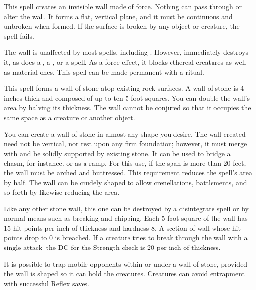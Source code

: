 \spellrng{\rngmed}
\begin{spelleffect}
  This spell creates an invisible wall made of force. Nothing can pass through or alter the wall. It forms a flat, vertical plane, and it must be continuous and unbroken when formed. If the surface is broken by any object or creature, the spell fails.
\end{spelleffect}
\begin{spellnotes}
  The wall is unaffected by most spells, including . However,  immediately destroys it, as does a , a , or a  spell. As a force effect, it blocks ethereal creatures as well as material ones.
This spell can be made permanent with a  ritual.
\end{spellnotes}

\spellrng{\rngmed}
\begin{spelleffect}
  This spell forms a wall of stone atop existing rock surfaces. A wall of stone is 4 inches thick and composed of up to ten 5-foot squares. You can double the wall's area by halving its thickness. The wall cannot be conjured so that it occupies the same space as a creature or another object.
  \par You can create a wall of stone in almost any shape you desire. The wall created need not be vertical, nor rest upon any firm foundation; however, it must merge with and be solidly supported by existing stone. It can be used to bridge a chasm, for instance, or as a ramp. For this use, if the span is more than 20 feet, the wall must be arched and buttressed. This requirement reduces the spell's area by half. The wall can be crudely shaped to allow crenellations, battlements, and so forth by likewise reducing the area.
  \par Like any other stone wall, this one can be destroyed by a disintegrate spell or by normal means such as breaking and chipping. Each 5-foot square of the wall has 15 hit points per inch of thickness and hardness 8. A section of wall whose hit points drop to 0 is breached. If a creature tries to break through the wall with a single attack, the DC for the Strength check is 20  per inch of thickness.
  \par It is possible to trap mobile opponents within or under a wall of stone, provided the wall is shaped so it can hold the creatures. Creatures can avoid entrapment with successful Reflex saves.
\end{spelleffect}

